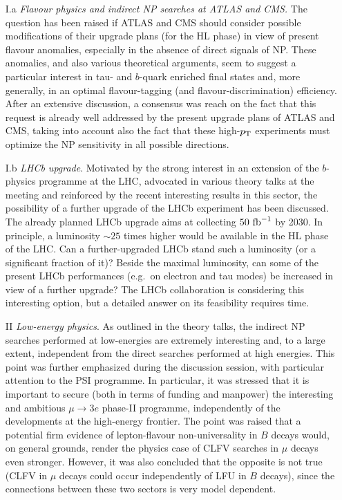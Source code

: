 \begin{enumerate}
\item[I.a] {\em Flavour physics and indirect NP searches at ATLAS and CMS.} 
The question has been raised if ATLAS and CMS should consider possible 
modifications of their upgrade plans (for the HL phase) in view of present flavour anomalies,
especially in the absence of direct signals of NP. These anomalies, and also various theoretical 
arguments, seem to suggest a particular interest in tau- and $b$-quark enriched final states
and, more generally, in an optimal flavour-tagging (and flavour-discrimination) efficiency. 
After an extensive discussion, a consensus was reach on the fact that this request
is already well addressed by the present upgrade plans of ATLAS and CMS,
taking into account also the fact that these high-$p_{\rm T}$ experiments 
must optimize the NP sensitivity in all possible directions.

\item[I.b] {\em  LHCb upgrade}. 
Motivated by the strong interest in an extension of the $b$-physics programme at the LHC,
advocated in various theory talks at the meeting and reinforced by the recent interesting results in this sector, 
the possibility of a further upgrade of the LHCb experiment has been discussed.
The already planned LHCb upgrade aims at collecting $50~{\rm fb}^{-1}$ by 2030.
In principle, a luminosity $\sim25$ times higher 
would be available in the HL phase of the LHC. Can a further-upgraded LHCb stand such a luminosity (or a significant fraction of it)? 
Beside the maximal luminosity, can some of the present LHCb performances (e.g.\ on electron and tau modes) 
be increased in view of a further upgrade? 
The LHCb collaboration is considering this interesting option, but a detailed answer on its feasibility requires time.

\item[II] {\em Low-energy physics}. As outlined in the theory talks, the indirect NP searches performed at low-energies 
are extremely interesting and, to a large extent, independent from the direct searches performed at high energies. 
This point was further emphasized during the discussion session, with particular attention to the PSI programme. 
In particular, it was stressed that it is important to secure (both in terms of funding and manpower) 
the interesting and ambitious $\mu \to 3 e$ phase-II programme, independently of the developments 
at the high-energy frontier. The point was raised that a potential firm evidence of lepton-flavour non-universality
in $B$ decays would, on general grounds, render the physics case of  CLFV searches 
in $\mu$ decays even stronger.  However, it was also concluded that the opposite is not true 
(CLFV in  $\mu$  decays could occur independently of LFU in $B$ decays), since the connections between these 
two sectors is very model dependent.


\end{enumerate}
